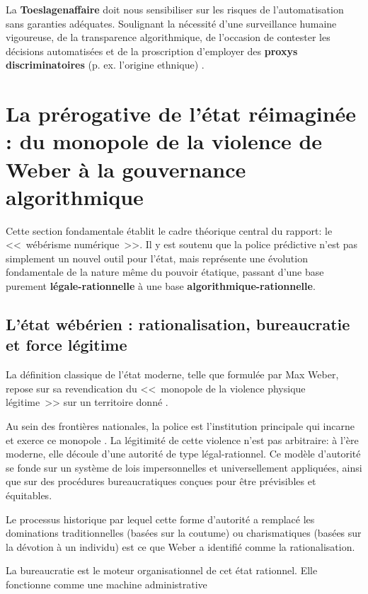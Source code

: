 La \textbf{Toeslagenaffaire} doit nous sensibiliser sur les risques de l'automatisation sans garanties adéquates. Soulignant la nécessité d'une surveillance humaine vigoureuse, de la transparence algorithmique, de l'occasion de contester les décisions automatisées et de la proscription d'employer des \textbf{proxys discriminatoires} (p. ex. l'origine ethnique) \citep{Heikkila2022, AmnestyInternational2021}.

\section{La prérogative de l'état réimaginée : du monopole de la violence de Weber à la gouvernance algorithmique}
\label{sec:prerogative}

Cette section fondamentale établit le cadre théorique central du rapport: le <<~wébérisme numérique~>>. Il y est soutenu que la police prédictive n'est pas simplement un nouvel outil pour l'état, mais représente une évolution fondamentale de la nature même du pouvoir étatique, passant d'une base purement \textbf{légale-rationnelle} à une base \textbf{algorithmique-rationnelle}.

\subsection{L'état wébérien : rationalisation, bureaucratie et force légitime}
\label{ssec:etat-weberien}

La définition classique de l'état moderne, telle que formulée par Max Weber, repose sur sa revendication du <<~monopole de la violence physique légitime~>> sur un territoire donné \citep{weber1959savant, weber1978economy}.

Au sein des frontières nationales, la police est l'institution principale qui incarne et exerce ce monopole \citep{brodeur2010policing}. La légitimité de cette violence n'est pas arbitraire: à l'ère moderne, elle découle d'une autorité de type légal-rationnel. Ce modèle d'autorité se fonde sur un système de lois impersonnelles et universellement appliquées, ainsi que sur des procédures bureaucratiques conçues pour être prévisibles et équitables. 

Le processus historique par lequel cette forme d'autorité a remplacé les dominations traditionnelles (basées sur la coutume) ou charismatiques (basées sur la dévotion à un individu) est ce que Weber a identifié comme la rationalisation.

La bureaucratie est le moteur organisationnel de cet état rationnel. Elle fonctionne comme une machine administrative
